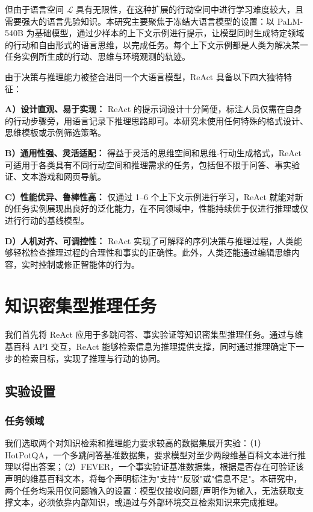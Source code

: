 但由于语言空间 $\mathcal{L}$ 具有无限性，在这种扩展的行动空间中进行学习难度较大，且需要强大的语言先验知识。本研究主要聚焦于冻结大语言模型的设置：以 PaLM-540B 为基础模型，通过少样本的上下文示例进行提示，让模型同时生成特定领域的行动和自由形式的语言思维，以完成任务。每个上下文示例都是人类为解决某一任务实例所生成的行动、思维与环境观测的轨迹。

由于决策与推理能力被整合进同一个大语言模型，ReAct 具备以下四大独特特征：

\textbf{A）设计直观、易于实现：} ReAct 的提示词设计十分简便，标注人员仅需在自身的行动步骤旁，用语言记录下推理思路即可。本研究未使用任何特殊的格式设计、思维模板或示例筛选策略。

\textbf{B）通用性强、灵活适配：} 得益于灵活的思维空间和思维-行动生成格式，ReAct 可适用于各类具有不同行动空间和推理需求的任务，包括但不限于问答、事实验证、文本游戏和网页导航。

\textbf{C）性能优异、鲁棒性高：} 仅通过 1--6 个上下文示例进行学习，ReAct 就能对新的任务实例展现出良好的泛化能力，在不同领域中，性能持续优于仅进行推理或仅进行行动的基线模型。

\textbf{D）人机对齐、可调控性：} ReAct 实现了可解释的序列决策与推理过程，人类能够轻松检查推理过程的合理性和事实的正确性。此外，人类还能通过编辑思维内容，实时控制或修正智能体的行为。

\section{知识密集型推理任务}

我们首先将 ReAct 应用于多跳问答、事实验证等知识密集型推理任务。通过与维基百科 API 交互，ReAct 能够检索信息为推理提供支撑，同时通过推理确定下一步的检索目标，实现了推理与行动的协同。

\subsection{实验设置}

\subsubsection*{任务领域}

我们选取两个对知识检索和推理能力要求较高的数据集展开实验：（1）HotPotQA，一个多跳问答基准数据集，要求模型对至少两段维基百科文本进行推理以得出答案；（2）FEVER，一个事实验证基准数据集，根据是否存在可验证该声明的维基百科文本，将每个声明标注为"支持""反驳"或"信息不足"。本研究中，两个任务均采用仅问题输入的设置：模型仅接收问题/声明作为输入，无法获取支撑文本，必须依靠内部知识，或通过与外部环境交互检索知识来完成推理。

